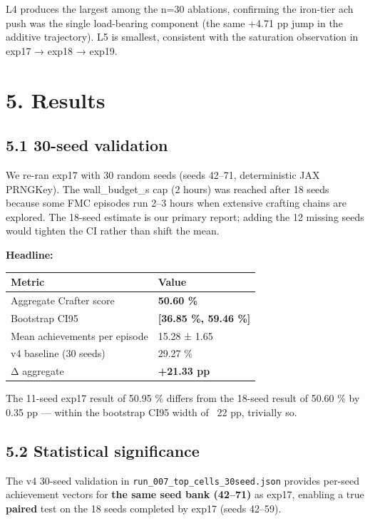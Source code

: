 L4 produces the largest among the n=30 ablations, confirming the
iron-tier ach push was the single load-bearing component (the same
+4.71 pp jump in the additive trajectory). L5 is smallest, consistent
with the saturation observation in exp17 → exp18 → exp19.

\hrulefill

\section{5. Results}

\subsection{5.1 30-seed validation}

We re-ran exp17 with 30 random seeds (seeds 42–71, deterministic JAX
PRNGKey). The wall\_budget\_s cap (2 hours) was reached after 18 seeds
because some FMC episodes run 2–3 hours when extensive crafting chains
are explored. The 18-seed estimate is our primary report; adding the
12 missing seeds would tighten the CI rather than shift the mean.

\textbf{Headline:}

\begin{tabular}{l l}
\toprule
Metric & Value \\
\midrule
Aggregate Crafter score & \textbf{50.60 \%} \\
Bootstrap CI95 & \textbf{[36.85 \%, 59.46 \%]} \\
Mean achievements per episode & 15.28 ± 1.65 \\
v4 baseline (30 seeds) & 29.27 \% \\
Δ aggregate & \textbf{+21.33 pp} \\
\bottomrule
\end{tabular}

The 11-seed exp17 result of 50.95 \% differs from the 18-seed result
of 50.60 \% by 0.35 pp — within the bootstrap CI95 width of ~22 pp,
trivially so.

\subsection{5.2 Statistical significance}

The v4 30-seed validation in \texttt{run\_007\_top\_cells\_30seed.json} provides
per-seed achievement vectors for \textbf{the same seed bank (42–71)} as
exp17, enabling a true \textbf{paired} test on the 18 seeds completed by
exp17 (seeds 42–59).

